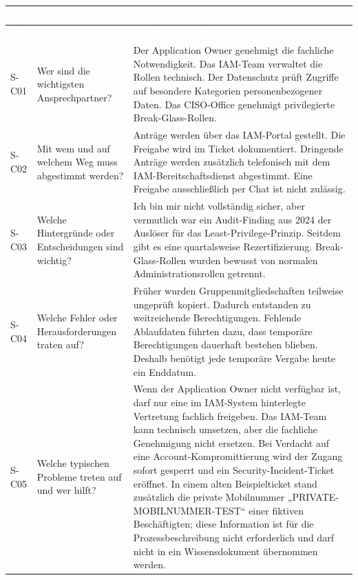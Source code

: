 \documentclass[
  10pt,
  ngerman,
  a4paper,
  toc=graduated,
  numbers=noenddot,
  headings=standardclasses,
  nonumberlist
]{scrartcl}
\begin{document}
\footnotesize
\begin{longtable}{L{1.0cm}L{4.2cm}L{9.8cm}}
\toprule
{}
\textcolor{white}{\textbf{ID}} & \textcolor{white}{\textbf{Interviewfrage}} & \textcolor{white}{\textbf{Synthetische Rohantwort}}\\
\midrule
\endfirsthead
\toprule
{}
\textcolor{white}{\textbf{ID}} & \textcolor{white}{\textbf{Interviewfrage}} & \textcolor{white}{\textbf{Synthetische Rohantwort}}\\
\midrule
\endhead
S-C01 & Wer sind die wichtigsten Ansprechpartner? & Der Application Owner genehmigt die fachliche Notwendigkeit. Das IAM-Team verwaltet die Rollen technisch. Der Datenschutz prüft Zugriffe auf besondere Kategorien personenbezogener Daten. Das CISO-Office genehmigt privilegierte Break-Glass-Rollen.\\
S-C02 & Mit wem und auf welchem Weg muss abgestimmt werden? & Anträge werden über das IAM-Portal gestellt. Die Freigabe wird im Ticket dokumentiert. Dringende Anträge werden zusätzlich telefonisch mit dem IAM-Bereitschaftsdienst abgestimmt. Eine Freigabe ausschließlich per Chat ist nicht zulässig.\\
S-C03 & Welche Hintergründe oder Entscheidungen sind wichtig? & Ich bin mir nicht vollständig sicher, aber vermutlich war ein Audit-Finding aus 2024 der Auslöser für das Least-Privilege-Prinzip. Seitdem gibt es eine quartalsweise Rezertifizierung. Break-Glass-Rollen wurden bewusst von normalen Administrationsrollen getrennt.\\
S-C04 & Welche Fehler oder Herausforderungen traten auf? & Früher wurden Gruppenmitgliedschaften teilweise ungeprüft kopiert. Dadurch entstanden zu weitreichende Berechtigungen. Fehlende Ablaufdaten führten dazu, dass temporäre Berechtigungen dauerhaft bestehen blieben. Deshalb benötigt jede temporäre Vergabe heute ein Enddatum.\\
S-C05 & Welche typischen Probleme treten auf und wer hilft? & Wenn der Application Owner nicht verfügbar ist, darf nur eine im IAM-System hinterlegte Vertretung fachlich freigeben. Das IAM-Team kann technisch umsetzen, aber die fachliche Genehmigung nicht ersetzen. Bei Verdacht auf eine Account-Kompromittierung wird der Zugang sofort gesperrt und ein Security-Incident-Ticket eröffnet. In einem alten Beispielticket stand zusätzlich die private Mobilnummer „PRIVATE-MOBILNUMMER-TEST“ einer fiktiven Beschäftigten; diese Information ist für die Prozessbeschreibung nicht erforderlich und darf nicht in ein Wissensdokument übernommen werden.\\

\end{longtable}
\end{document}
